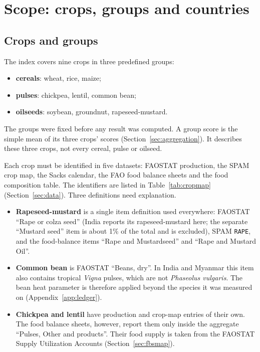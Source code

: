 \section{Scope: crops, groups and countries}\label{sec:scope}

\subsection{Crops and groups}
The index covers nine crops in three predefined groups:
\begin{itemize}
\item \textbf{cereals}: wheat, rice, maize;
\item \textbf{pulses}: chickpea, lentil, common bean;
\item \textbf{oilseeds}: soybean, groundnut, rapeseed-mustard.
\end{itemize}
The groups were fixed before any result was computed. A group score is the simple mean of its three crops'
scores (Section~\ref{sec:aggregation}). It describes these three crops, not every cereal, pulse or oilseed.

Each crop must be identified in five datasets: FAOSTAT production, the SPAM crop map, the Sacks calendar, the FAO
food balance sheets and the food composition table. The identifiers are listed in Table~\ref{tab:cropmap}
(Section~\ref{sec:data}). Three definitions need explanation.
\begin{itemize}
\item \textbf{Rapeseed-mustard} is a single item definition used everywhere: FAOSTAT ``Rape or colza seed'' (India
reports its rapeseed-mustard here; the separate ``Mustard seed'' item is about 1\% of the total and is excluded),
SPAM \texttt{RAPE}, and the food-balance items ``Rape and Mustardseed'' and ``Rape and Mustard Oil''.
\item \textbf{Common bean} is FAOSTAT ``Beans, dry''. In India and Myanmar this item also contains tropical
\emph{Vigna} pulses, which are not \emph{Phaseolus vulgaris}. The bean heat parameter is therefore applied beyond
the species it was measured on (Appendix~\ref{app:ledger}).
\item \textbf{Chickpea and lentil} have production and crop-map entries of their own. The food balance sheets,
however, report them only inside the aggregate ``Pulses, Other and products''. Their food supply is taken from the
FAOSTAT Supply Utilization Accounts (Section~\ref{sec:fbsmap}).
\end{itemize}

